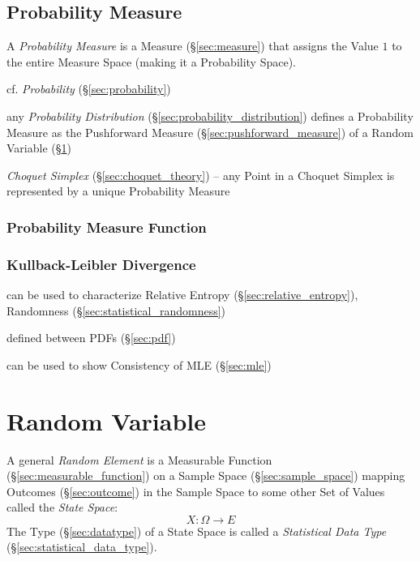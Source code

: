 \subsection{Probability Measure}\label{sec:probability_measure}

A \emph{Probability Measure} is a Measure (\S\ref{sec:measure}) that assigns the
Value $1$ to the entire Measure Space (making it a Probability Space).

cf. \emph{Probability} (\S\ref{sec:probability})

\fist any \emph{Probability Distribution} (\S\ref{sec:probability_distribution})
defines a Probability Measure as the Pushforward Measure
(\S\ref{sec:pushforward_measure}) of a Random Variable
(\S\ref{sec:random_variable})

\emph{Choquet Simplex} (\S\ref{sec:choquet_theory}) -- any Point in a Choquet
Simplex is represented by a unique Probability Measure



\subsubsection{Probability Measure Function}
\label{sec:probability_measure_function}

\subsubsection{Kullback-Leibler Divergence}\label{sec:kullback_leibler}

can be used to characterize Relative Entropy (\S\ref{sec:relative_entropy}),
Randomness (\S\ref{sec:statistical_randomness})

defined between PDFs (\S\ref{sec:pdf})

can be used to show Consistency of MLE (\S\ref{sec:mle})



\section{Random Variable}\label{sec:random_variable}

A general \emph{Random Element} is a Measurable Function
(\S\ref{sec:measurable_function}) on a Sample Space (\S\ref{sec:sample_space})
mapping Outcomes (\S\ref{sec:outcome}) in the Sample Space to some other Set of
Values called the \emph{State Space}:
\[
  X : \Omega \to E
\]
The Type (\S\ref{sec:datatype}) of a State Space is called a \emph{Statistical
  Data Type} (\S\ref{sec:statistical_data_type}).

